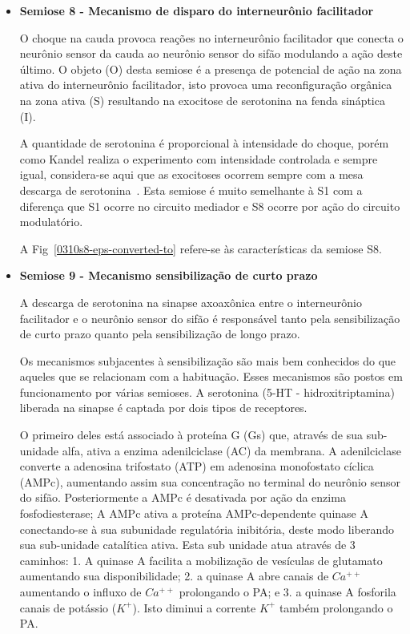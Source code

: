 \begin{itemize}
	\item \textbf{Semiose 8 - Mecanismo de disparo do interneurônio facilitador}

	O choque na cauda provoca reações no interneurônio facilitador que conecta o neurônio sensor da cauda ao neurônio sensor do sifão modulando a ação deste último. O objeto (O) desta semiose é a presença de potencial de ação na zona ativa do interneurônio facilitador, isto provoca uma reconfiguração orgânica na zona ativa (S) resultando na exocitose de serotonina na fenda sináptica (I).

	A quantidade de serotonina é proporcional à intensidade do choque, porém como Kandel realiza o experimento com intensidade controlada e sempre igual, considera-se aqui que as exocitoses ocorrem sempre com a mesa descarga de serotonina~\cite{kandel06,kandel00, lent01}. Esta semiose é muito semelhante à S1 com a diferença que S1 ocorre no circuito mediador e S8 ocorre por ação do circuito modulatório.

	A Fig~\ref{0310s8-eps-converted-to} refere-se às características da semiose S8.


	\item \textbf{Semiose 9 - Mecanismo sensibilização de curto prazo}

	A descarga de serotonina na sinapse axoaxônica entre o interneurônio facilitador e o neurônio sensor do sifão é responsável tanto pela sensibilização de curto prazo quanto pela sensibilização de longo prazo.

	Os mecanismos subjacentes à sensibilização são mais bem conhecidos do que aqueles que se relacionam com a habituação. Esses mecanismos são postos em funcionamento por várias semioses. A serotonina (5-HT - hidroxitriptamina) liberada na sinapse é captada por dois tipos de receptores.

	O primeiro deles está associado à proteína G (Gs) que, através de sua sub-unidade alfa, ativa a enzima adenilciclase (AC) da membrana. A adenilciclase converte a adenosina trifostato (ATP) em adenosina monofostato cíclica (AMPc), aumentando assim sua concentração no terminal do neurônio sensor do sifão. Posteriormente a AMPc é desativada por ação da enzima fosfodiesterase; A AMPc ativa a proteína AMPc-dependente quinase A conectando-se à sua subunidade regulatória inibitória, deste modo liberando sua sub-unidade catalítica ativa. Esta sub unidade atua através de 3 caminhos: 1. A quinase A facilita a mobilização de vesículas de glutamato aumentando sua disponibilidade; 2. a quinase A abre canais de $Ca^{++}$ aumentando o influxo de $Ca^{++}$ prolongando o PA; e 3. a quinase A fosforila canais de potássio ($K^+$). Isto diminui a corrente $K^+$ também prolongando o PA.


\end{itemize}
